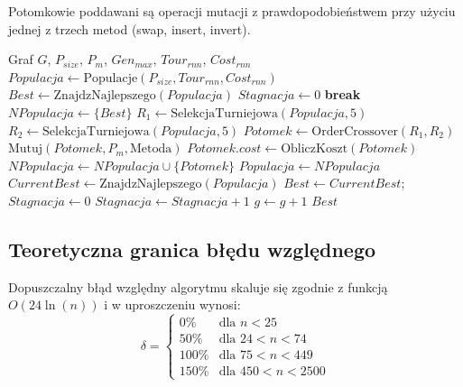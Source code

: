 \documentclass[conference]{IEEEtran}
\begin{document}
            Potomkowie poddawani są operacji mutacji z prawdopodobieństwem przy użyciu jednej z trzech metod (swap, insert, invert).
            \begin{algorithm}
                \caption{Genetic Algorithm}
                \begin{algorithmic}[1]
                \REQUIRE Graf $G$, $P_{size}$, $P_m$, $Gen_{max}$, $Tour_{rnn}$, $Cost_{rnn}$
                \STATE $Populacja \leftarrow \text{Populacje}(P_{size}, Tour_{rnn}, Cost_{rnn})$
                \STATE $Best \leftarrow \text{ZnajdzNajlepszego}(Populacja)$
                \STATE $Stagnacja \leftarrow 0$
                     \STATE \textbf{break}  \ENDIF
                    \STATE $NPopulacja \leftarrow \{Best\}$ 
                        \STATE $R_1 \leftarrow \text{SelekcjaTurniejowa}(Populacja, 5)$
                        \STATE $R_2 \leftarrow \text{SelekcjaTurniejowa}(Populacja, 5)$
                        \STATE $Potomek \leftarrow \text{OrderCrossover}(R_1, R_2)$
                        \STATE $\text{Mutuj}(Potomek, P_m, \text{Metoda})$
                        \STATE $Potomek.cost \leftarrow \text{ObliczKoszt}(Potomek)$
                        \STATE $NPopulacja \leftarrow NPopulacja \cup \{Potomek\}$
                    \ENDWHILE
                    \STATE $Populacja \leftarrow NPopulacja$
                    \STATE $CurrentBest \leftarrow \text{ZnajdzNajlepszego}(Populacja)$
                        \STATE $Best \leftarrow CurrentBest$; $Stagnacja \leftarrow 0$
                    \ELSE
                        \STATE $Stagnacja \leftarrow Stagnacja + 1$
                    \ENDIF
                    \STATE $g \leftarrow g + 1$
                \ENDWHILE
                \RETURN $Best$
                \end{algorithmic}
            \end{algorithm}
        \subsection{Teoretyczna granica błędu względnego} 
            Dopuszczalny błąd względny algorytmu skaluje się zgodnie z funkcją $O(24\ln(n))$ i w uproszczeniu wynosi:
            \begin{equation}
                \delta = 
                \begin{cases} 
                    0\% & \text{dla } n < 25 \\
                    50\% & \text{dla } 24 < n < 74 \\
                    100\% & \text{dla } 75 < n < 449 \\
                    150\% & \text{dla } 450 < n < 2500 
                \end{cases}
            \end{equation}
\end{document}
